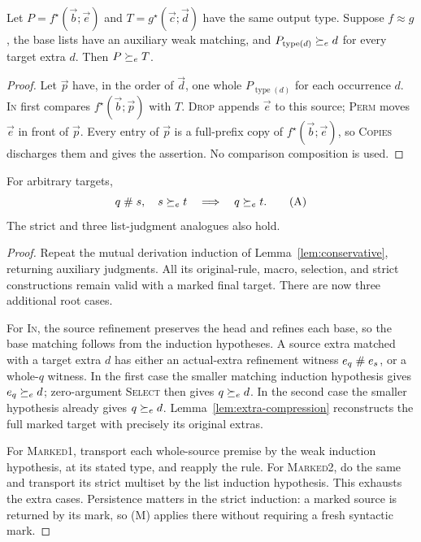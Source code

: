 \begin{lemma}\label{lem:extra-compression}
Let $P=f^\star(\vec b;\vec e)$ and
$T=g^\star(\vec c;\vec d)$ have the same output type.
Suppose $f\approx g$, the base lists have an auxiliary weak
matching, and $P_{\operatorname{type}(d)}\succeq_e d$ for every
target extra $d$. Then $P\succeq_e T$.
\end{lemma}
\begin{proof}
Let $\vec p$ have, in the order of $\vec d$, one whole
$P_{\operatorname{type}(d)}$ for each occurrence $d$.
\textsc{In} first compares
$f^\star(\vec b;\vec p)$ with $T$.
\textsc{Drop} appends $\vec e$ to this source;
\textsc{Perm} moves $\vec e$ in front of $\vec p$.
Every entry of $\vec p$ is a full-prefix copy of
$f^\star(\vec b;\vec e)$, so \textsc{Copies} discharges
them and gives the assertion. No comparison composition
is used.
\end{proof}

\begin{lemma}\label{lem:sharp-admissible}
For arbitrary targets,
\[
 q\mathrel{\#} s,\quad s\succeq_e t\quad\Longrightarrow\quad q\succeq_e t.
 \tag{A}
\]
The strict and three list-judgment analogues also hold.
\end{lemma}
\begin{proof}
Repeat the mutual derivation induction of
Lemma~\ref{lem:conservative}, returning auxiliary judgments.
All its original-rule, macro, selection, and strict
constructions remain valid with a marked final target.
There are now three additional root cases.

For \textsc{In}, the source refinement preserves the
head and refines each base, so the base matching follows
from the induction hypotheses. A source extra matched
with a target extra $d$ has either an actual-extra
refinement witness $e_q\mathrel{\#} e_s$, or a whole-$q$
witness. In the first case the smaller matching
induction hypothesis gives $e_q\succeq_e d$; zero-argument
\textsc{Select} then gives $q\succeq_e d$. In the second case
the smaller hypothesis already gives $q\succeq_e d$.
Lemma~\ref{lem:extra-compression} reconstructs the full
marked target with precisely its original extras.

For \textsc{Marked1}, transport each whole-source
premise by the weak induction hypothesis, at its stated
type, and reapply the rule. For \textsc{Marked2}, do
the same and transport its strict multiset by the list
induction hypothesis. This exhausts the extra cases.
Persistence matters in the strict induction: a marked
source is returned by its mark, so (M) applies there
without requiring a fresh syntactic mark.
\end{proof}

